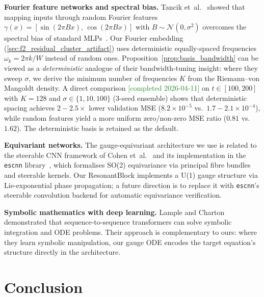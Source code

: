 \documentclass[11pt, a4paper]{article}
\theoremstyle{definition}
\theoremstyle{plain}
\begin{document}
\smallskip\noindent\textbf{Fourier feature networks and spectral bias.}
Tancik et~al.~\cite{Tancik2020FourierFeatures} showed that mapping
inputs through random Fourier features
$\gamma(x) = [\sin(2\pi Bx),\,\cos(2\pi Bx)]$ with
$B\sim\mathcal{N}(0,\sigma^2)$ overcomes the spectral bias of
standard MLPs~\cite{Rahaman2019SpectralBias}.  Our Fourier embedding
(\cref{sec:f2_residual_cluster_artifact}) uses deterministic
equally-spaced frequencies $\omega_k = 2\pi k/W$ instead of random
ones.  Proposition~\ref{prop:basis_bandwidth} can be viewed as a
\emph{deterministic} analogue of their bandwidth-tuning insight: where
they sweep $\sigma$, we derive the minimum number of frequencies $K$
from the Riemann--von Mangoldt density.  A direct comparison
\textcolor{ForestGreen}{[completed 2026-04-11]} on $t\in[100,200]$
with $K=128$ and $\sigma\in\{1,10,100\}$ (3-seed ensemble) shows
that deterministic spacing achieves $2{-}2.5\times$ lower
validation MSE ($8.2\times10^{-5}$ vs.\
$1.7{-}2.1\times10^{-4}$), while random features yield a more
uniform zero/non-zero MSE ratio ($0.81$ vs.\ $1.62$).  The
deterministic basis is retained as the default.

\smallskip\noindent\textbf{Equivariant networks.}
The gauge-equivariant architecture we use is related to the steerable
CNN framework of Cohen et~al.~\cite{Cohen2019Gauge} and its
implementation in the \texttt{escnn} library~\cite{Cesa2022ESCNN},
which formalises SO(2) equivariance via principal fibre bundles and
steerable kernels.  Our ResonantBlock implements a U(1) gauge
structure via Lie-exponential phase propagation; a future direction is
to replace it with \texttt{escnn}'s steerable convolution backend for
automatic equivariance verification.

\smallskip\noindent\textbf{Symbolic mathematics with deep learning.}
Lample and Charton~\cite{Lample2020SymbolicMath} demonstrated that
sequence-to-sequence transformers can solve symbolic integration and
ODE problems.  Their approach is complementary to ours: where they
learn symbolic manipulation, our gauge ODE encodes the target
equation's structure directly in the architecture.

\section{Conclusion}
\label{sec:conclusion}
\end{document}
